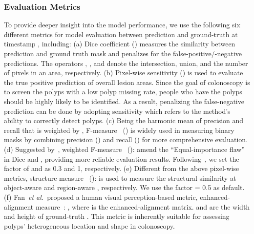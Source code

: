 \documentclass[default,iicol]{sn-jnl}
\theoremstyle{thmstyleone}
\theoremstyle{thmstyletwo}
\theoremstyle{thmstylethree}
\def\etal{{\em et al.}}
\begin{document}
\subsubsection{Evaluation Metrics} 
To provide deeper insight into the model performance, we use the following six different metrics for model evaluation between prediction  and ground-truth  at timestamp , including:
(a) Dice coefficient () measures the similarity between prediction and ground truth mask and penalizes for the false-positive/-negative predictions.
The operators , , and  denote the intersection, union, and the number of pixels in an area, respectively.
(b) Pixel-wise sensitivity () is used to evaluate the true positive prediction of overall lesion areas.
Since the goal of colonoscopy is to screen the polyps with a low polyp missing rate, people who have the polyps should be highly likely to be identified.
As a result, penalizing the false-negative prediction can be done by adopting sensitivity which refers to the method's ability to correctly detect polyps.
(c) Being the harmonic mean of precision and recall that is weighted by , F-measure~\cite{achanta2009frequency} ()
is widely used in measuring binary masks by combining precision () and recall () for more comprehensive evaluation.
(d) Suggested by~\cite{fan2021cognitive,cheng2021structure}, weighted F-measure~\cite{margolin2014evaluate} ():
amend the ``Equal-importance flaw'' in Dice and , providing more reliable evaluation results.
Following~\cite{borji2015salient}, we set the factor  of  and  as 0.3 and 1, respectively.
(e) Different from the above pixel-wise metrics, structure measure~\cite{fan2017structure} ():
is used to measure the structural similarity at object-aware  and region-aware , respectively.
We use the factor  = 0.5 as default.
(f) Fan~\etal~proposed a human visual perception-based metric, enhanced-alignment measure~\cite{fan2018enhanced}: , where  is the enhanced-alignment matrix.
 and  are the width and height of ground-truth .
This metric is inherently suitable for assessing polyps' heterogeneous location and shape in colonoscopy.
\end{document}
